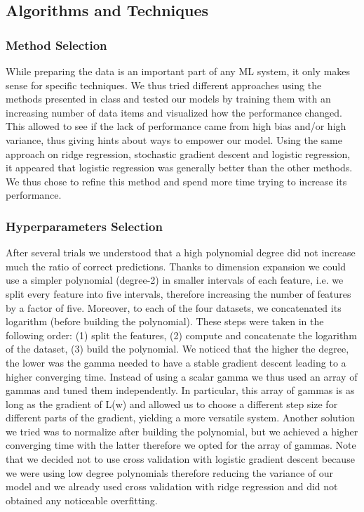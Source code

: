\documentclass[10pt,conference,compsocconf]{IEEEtran}
\begin{document}

\subsection{Algorithms and Techniques}
\subsubsection{Method Selection}
While preparing the data is an important part of any ML system, it only makes sense for specific techniques. 
We thus tried different approaches using the methods presented in class and tested our models by training them with an increasing number of data items and visualized how the performance changed. This allowed to see if the lack of performance came from high bias and/or high variance, thus giving hints about ways to empower our model. 
Using the same approach on ridge regression, stochastic gradient descent and logistic regression, it appeared that logistic regression was generally better than the other methods. We thus chose to refine this method and spend more time trying to increase its performance. 

\subsubsection{Hyperparameters Selection}
After several trials we understood that a high polynomial degree did not increase much the ratio of correct predictions. Thanks to dimension expansion we could use a simpler polynomial (degree-2) in smaller intervals of each feature, i.e. we split every feature into five intervals, therefore increasing the number of features by a factor of five. Moreover, to each of the four datasets, we concatenated its logarithm (before building the polynomial). These steps were taken in the following order: (1) split the features, (2) compute and concatenate the logarithm of the dataset, (3) build the polynomial.  
We noticed that the higher the degree, the lower was the gamma needed to have a stable gradient descent leading to a higher converging time. Instead of using a scalar gamma we thus used an array of gammas and tuned them independently. In particular, this array of gammas is as long as the gradient of L(w) and allowed us to choose a different step size for different parts of the gradient, yielding a more versatile system. Another solution we tried was to normalize after building the polynomial, but we achieved a higher converging time with the latter therefore we opted for the array of gammas. Note that we decided not to use cross validation with logistic gradient descent because we were using low degree polynomials therefore reducing the variance of our model and we already used cross validation with ridge regression and did not obtained any noticeable overfitting.
\end{document}
